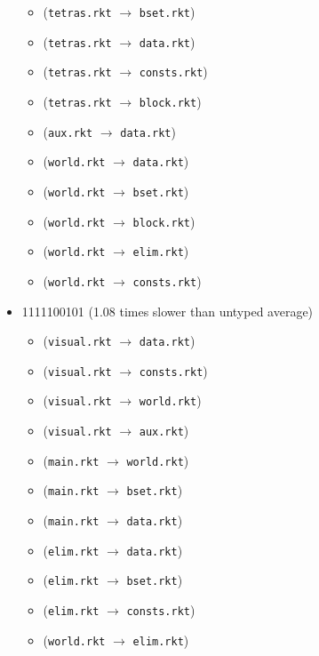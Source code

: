\documentclass{article}
\newcommand{\mono}[1]{\texttt{#1}}
\begin{document}
\begin{itemize}
\begin{itemize}
  \item (\mono{tetras.rkt} $\rightarrow$ \mono{bset.rkt})
  \item (\mono{tetras.rkt} $\rightarrow$ \mono{data.rkt})
  \item (\mono{tetras.rkt} $\rightarrow$ \mono{consts.rkt})
  \item (\mono{tetras.rkt} $\rightarrow$ \mono{block.rkt})
  \item (\mono{aux.rkt} $\rightarrow$ \mono{data.rkt})
  \item (\mono{world.rkt} $\rightarrow$ \mono{data.rkt})
  \item (\mono{world.rkt} $\rightarrow$ \mono{bset.rkt})
  \item (\mono{world.rkt} $\rightarrow$ \mono{block.rkt})
  \item (\mono{world.rkt} $\rightarrow$ \mono{elim.rkt})
  \item (\mono{world.rkt} $\rightarrow$ \mono{consts.rkt})
  \end{itemize}
\item 1111100101 (1.08 times slower than untyped average)
  \begin{itemize}
  \item (\mono{visual.rkt} $\rightarrow$ \mono{data.rkt})
  \item (\mono{visual.rkt} $\rightarrow$ \mono{consts.rkt})
  \item (\mono{visual.rkt} $\rightarrow$ \mono{world.rkt})
  \item (\mono{visual.rkt} $\rightarrow$ \mono{aux.rkt})
  \item (\mono{main.rkt} $\rightarrow$ \mono{world.rkt})
  \item (\mono{main.rkt} $\rightarrow$ \mono{bset.rkt})
  \item (\mono{main.rkt} $\rightarrow$ \mono{data.rkt})
  \item (\mono{elim.rkt} $\rightarrow$ \mono{data.rkt})
  \item (\mono{elim.rkt} $\rightarrow$ \mono{bset.rkt})
  \item (\mono{elim.rkt} $\rightarrow$ \mono{consts.rkt})
  \item (\mono{world.rkt} $\rightarrow$ \mono{elim.rkt})
  \end{itemize}


\end{itemize}
\end{document}
